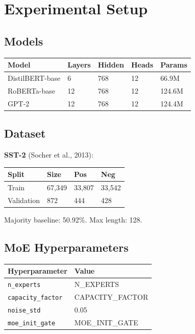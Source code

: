 \section{Experimental Setup}

\subsection{Models}

\begin{table}[H]
\centering
\small
\begin{tabular}{lllll}
\toprule
\textbf{Model} & \textbf{Layers} & \textbf{Hidden} & \textbf{Heads} & \textbf{Params} \\
\midrule
DistilBERT-base & 6 & 768 & 12 & 66.9M \\
RoBERTa-base & 12 & 768 & 12 & 124.6M \\
GPT-2 & 12 & 768 & 12 & 124.4M \\
\bottomrule
\end{tabular}
\end{table}

\subsection{Dataset}

\textbf{SST-2} (Socher et al., 2013):

\begin{table}[H]
\centering
\small
\begin{tabular}{llll}
\toprule
\textbf{Split} & \textbf{Size} & \textbf{Pos} & \textbf{Neg} \\
\midrule
Train & 67,349 & 33,807 & 33,542 \\
Validation & 872 & 444 & 428 \\
\bottomrule
\end{tabular}
\end{table}

Majority baseline: 50.92\%. Max length: 128.

\subsection{MoE Hyperparameters}

\begin{table}[H]
\centering
\small
\begin{tabular}{ll}
\toprule
\textbf{Hyperparameter} & \textbf{Value} \\
\midrule
\texttt{n\_experts} & {{N\_EXPERTS}} \\
\texttt{capacity\_factor} & {{CAPACITY\_FACTOR}} \\
\texttt{noise\_std} & 0.05 \\
\texttt{moe\_init\_gate} & {{MOE\_INIT\_GATE}} \\
\bottomrule
\end{tabular}
\end{table}

